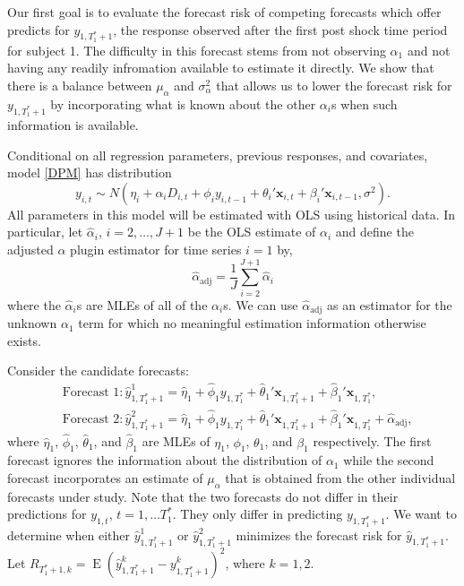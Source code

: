\documentclass[11pt]{article}
\newcommand{\x}{\textbf{x}}
\DeclareMathOperator{\E}{E}
\begin{document}
Our first goal is to evaluate the forecast risk of competing forecasts which 
offer predicts for $y_{1, T_1^* + 1}$, the response observed after the first 
post shock time period for subject 1.  The difficulty in this forecast stems 
from not observing $\alpha_1$ and not having any readily infromation available 
to estimate it directly.  We show that there is a balance between $\mu_\alpha$ 
and $\sigma_\alpha^2$ that allows us to lower the forecast risk for 
$y_{1, T_1^* + 1}$ by incorporating what is known about the other $\alpha_i$s 
when such information is available.

Conditional on all regression parameters, previous responses, and covariates, 
model \eqref{DPM} has distribution 
$$
  y_{i,t} 
    \sim N(\eta_i + \alpha_iD_{i,t} + \phi_i y_{i,t-1} + \theta_i'\x_{i,t} 
      + \beta_i'\x_{i,t-1}, \sigma^2).
$$
All parameters in this model will be estimated with OLS using historical data. 
In particular, let $\hat{\alpha}_i$, $i = 2, \ldots, J+1$ be the OLS estimate 
of $\alpha_i$ and define the adjusted $\alpha$ plugin estimator for time 
series $i=1$ by,
\begin{equation} \label{adjusted}
  \hat{\alpha}_{\text{adj}} = \frac{1}{J}\sum_{i=2}^{J+1}\hat{\alpha}_i
\end{equation}
where the $\hat{\alpha}_i$s are MLEs of all of the $\alpha_i$s.  
We can use $\hat{\alpha}_{\text{adj}}$ as an estimator for the unknown 
$\alpha_1$ term for which no meaningful estimation information otherwise 
exists. 


Consider the candidate forecasts: 
\begin{align*}
  &\text{Forecast 1}: \hat y_{1,T_1^*+1}^1 = \hat\eta_1 
    + \hat\phi_1 y_{1,T_1^*} + \hat\theta_1'\x_{1,T_1^*+1} 
    + \hat\beta_1'\x_{1,T_1^*}, \\
  &\text{Forecast 2}: \hat y_{1,T_1^*+1}^2 = \hat\eta_1 
    + \hat\phi_1 y_{1,T_1^*} + \hat\theta_1'\x_{1,T_1^*+1} 
    + \hat\beta_1'\x_{1,T_1^*} + \hat{\alpha}_{\text{adj}},
\end{align*}
where $\hat\eta_1$, $\hat\phi_1$, $\hat\theta_1$, and $\hat\beta_1$ are MLEs 
of $\eta_1$, $\phi_1$, $\theta_1$, and $\beta_1$ respectively.  
The first forecast ignores the information about the distribution of 
$\alpha_1$ while the second forecast incorporates an estimate of $\mu_\alpha$ 
that is obtained from the other individual forecasts under study.  
Note that the two forecasts do not differ in their predictions for 
$y_{1,t}$, $t = 1,\ldots T_1^*$.  They only differ in predicting 
$y_{1,T_1^*+1}$.  We want to determine when either $\hat y_{1,T_1^*+1}^1$ or 
$\hat y_{1,T_1^*+1}^2$ minimizes the forecast risk for $\hat y_{1,T_1^*+1}$.  
Let $R_{T_1^*+1, k} = \E(\hat y_{1,T_1^*+1}^k - y_{1,T_1^*+1}^k)^2$, 
where $k = 1,2$.  \\
\end{document}
